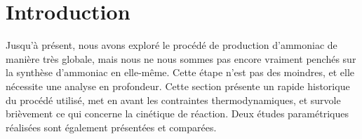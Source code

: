 \section{Introduction}
Jusqu'à présent, nous avons exploré le procédé de production d'ammoniac de manière très globale, mais nous ne nous
sommes pas encore vraiment penchés sur la synthèse d'ammoniac en elle-même. Cette étape n'est pas des moindres, et
elle nécessite une analyse en profondeur. Cette section présente un rapide historique du procédé utilisé, met en
avant les contraintes thermodynamiques, et survole brièvement ce qui concerne la cinétique de réaction. Deux études
paramétriques réalisées sont également présentées et comparées.
